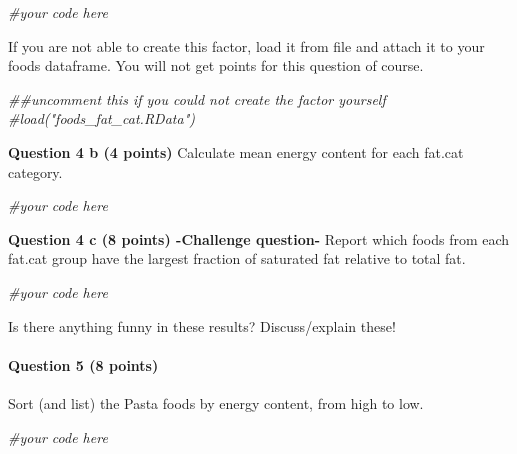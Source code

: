 \documentclass[
  a4paper]{article}
\newenvironment{Shaded}{\begin{snugshade}}{\end{snugshade}}
\newcommand{\CommentTok}[1]{\textcolor[rgb]{0.56,0.35,0.01}{\textit{#1}}}
\begin{document}
\begin{Shaded}
\begin{Highlighting}[]
\CommentTok{#your code here}
\end{Highlighting}
\end{Shaded}

If you are not able to create this factor, load it from file and attach
it to your foods dataframe. You will not get points for this question of
course.

\begin{Shaded}
\begin{Highlighting}[]
\CommentTok{##uncomment this if you could not create the factor yourself}
\CommentTok{#load("foods_fat_cat.RData")}
\end{Highlighting}
\end{Shaded}

\textbf{Question 4 b (4 points)} Calculate mean energy content for each
fat.cat category.

\begin{Shaded}
\begin{Highlighting}[]
\CommentTok{#your code here}
\end{Highlighting}
\end{Shaded}

\textbf{Question 4 c (8 points) -Challenge question-} Report which foods
from each fat.cat group have the largest fraction of saturated fat
relative to total fat.

\begin{Shaded}
\begin{Highlighting}[]
\CommentTok{#your code here}
\end{Highlighting}
\end{Shaded}

Is there anything funny in these results? Discuss/explain these!

\hypertarget{question-5-8-points}{%
\paragraph{Question 5 (8 points)}\label{question-5-8-points}}

Sort (and list) the Pasta foods by energy content, from high to low.

\begin{Shaded}
\begin{Highlighting}[]
\CommentTok{#your code here}
\end{Highlighting}
\end{Shaded}
\end{document}

